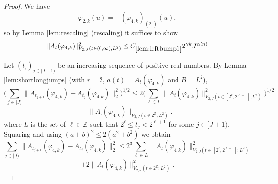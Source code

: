 \documentclass[12pt,reqno]{amsart}
\theoremstyle{plain}
\numberwithin{equation}{section}
\theoremstyle{remark}
\begin{document}
\begin{proof}
We have
\[\varphi_{2,k}(u)=-(\varphi_{4,k})_{(2^k)}(u),\]
so by Lemma \ref{lem:rescaling} (rescaling) it suffices to show
\begin{equation}
\|A_{t}({\varphi_{4,k}}) \|_{V_{2,J}(t\in(0,\infty);L^2)}^2\le C_{\ref{lem:leftbump1}} 2^{\gamma k} J^{\alpha(n)}
\end{equation}

Let $(t_j)_{j\in[J+1)}$ be an increasing sequence of positive real numbers.
By Lemma \ref{lem:shortlongjumps} (with $r=2$, $a(t) = A_t({\varphi_{4,k}}) $ and $B=L^2$),
\begin{equation}  \Big(\sum_{j\in [J)} \|A_{t_{j+1}}({\varphi_{4,k}}) - A_{t_j}({\varphi_{4,k}}) \|_2^2\Big)^{1/2} \le 2 \Big(\sum_{\ell \in L} \|A_t({\varphi_{4,k}}) \|_{V_{2,J}(t\in [2^\ell, 2^{\ell+1}]; L^2)}^2\Big)^{1/2}
\end{equation}
\begin{equation}
+\|A_t({\varphi_{4,k}}) \|_{V_{2,J}(t\in 2^\mathbb{Z}; L^2)}.
\end{equation}
where $L$ is the set of $\ell\in \mathbb{Z}$ such that $2^{\ell}\le t_j<2^{\ell+1}$ for some $j\in [J+1)$.
Squaring and using $(a+b)^2\le 2(a^2+b^2)$ we obtain
\begin{equation}\label{shortlongftc_reduction_pf12} \sum_{j\in [J)} \|A_{t_{j+1}}(\varphi_{4,k})- A_{t_j}(\varphi_{4,k})\|_2^2  \le 2^3 \sum_{\ell \in L} \|A_t(\varphi_{4,k})\|_{V_{2,J}(t\in [2^\ell, 2^{\ell+1}]; L^2)}^2
\end{equation}
\begin{equation}\label{shortlongftc_reduction_pf22}
+ 2 \|A_t(\varphi_{4,k})\|^2_{V_{2,J}(t\in 2^\mathbb{Z}; L^2)}.
\end{equation}


\end{proof}
\end{document}
